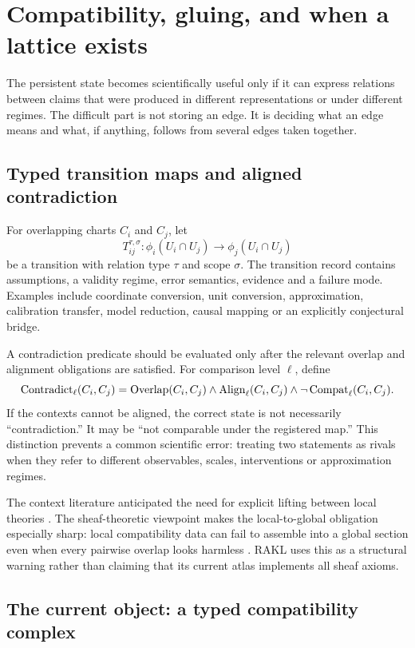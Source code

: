 \section{Compatibility, gluing, and when a lattice exists}

The persistent state becomes scientifically useful only if it can express relations between claims that were produced in different representations or under different regimes. The difficult part is not storing an edge. It is deciding what an edge means and what, if anything, follows from several edges taken together.

\subsection{Typed transition maps and aligned contradiction}

For overlapping charts \(C_i\) and \(C_j\), let
\[
T_{ij}^{\tau,\sigma}:\phi_i(U_i\cap U_j)\longrightarrow\phi_j(U_i\cap U_j)
\]
be a transition with relation type \(\tau\) and scope \(\sigma\). The transition record contains assumptions, a validity regime, error semantics, evidence and a failure mode. Examples include coordinate conversion, unit conversion, approximation, calibration transfer, model reduction, causal mapping or an explicitly conjectural bridge.

A contradiction predicate should be evaluated only after the relevant overlap and alignment obligations are satisfied. For comparison level \(\ell\), define
\[
\operatorname{Contradict}_{\ell}(C_i,C_j)=
\operatorname{Overlap}(C_i,C_j)\land
\operatorname{Align}_{\ell}(C_i,C_j)\land
\neg\operatorname{Compat}_{\ell}(C_i,C_j).
\]
If the contexts cannot be aligned, the correct state is not necessarily ``contradiction.'' It may be ``not comparable under the registered map.'' This distinction prevents a common scientific error: treating two statements as rivals when they refer to different observables, scales, interventions or approximation regimes.

The context literature anticipated the need for explicit lifting between local theories \cite{mccarthy1993,giunchiglia1993}. The sheaf-theoretic viewpoint makes the local-to-global obligation especially sharp: local compatibility data can fail to assemble into a global section even when every pairwise overlap looks harmless \cite{abramsky2011,curry2014,robinson2017}. RAKL uses this as a structural warning rather than claiming that its current atlas implements all sheaf axioms.

\subsection{The current object: a typed compatibility complex}


